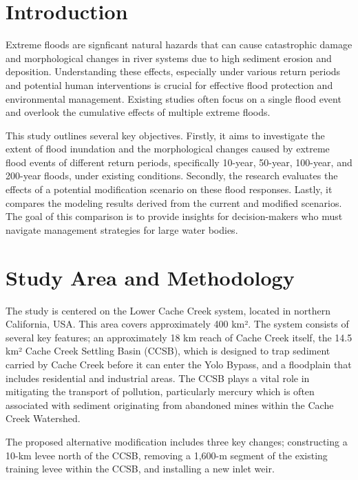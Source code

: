 \documentclass[a4paper, 11pt]{article}
\begin{document}
\section{Introduction}

\hspace*{0.5cm}Extreme floods are signficant natural hazards that can cause catastrophic damage and morphological changes in river systems due to high sediment erosion and deposition. Understanding these effects, especially under various return periods and potential human interventions is crucial for effective flood protection and environmental management. Existing studies often focus on a single flood event and overlook the cumulative effects of multiple extreme floods. 

This study outlines several key objectives. Firstly, it aims to investigate the extent of flood inundation and the morphological changes caused by extreme flood events of different return periods, specifically 10-year, 50-year, 100-year, and 200-year floods, under existing conditions. Secondly, the research evaluates the effects of a potential modification scenario on these flood responses. Lastly, it compares the modeling results derived from the current and modified scenarios. The goal of this comparison is to provide insights for decision-makers who must navigate management strategies for large water bodies.

\section{Study Area and Methodology}
\hspace*{0.5cm}The study is centered on the Lower Cache Creek system, located in northern California, USA. This area covers approximately 400 km². The system consists of several key features; an approximately 18 km reach of Cache Creek itself, the 14.5 km² Cache Creek Settling Basin (CCSB), which is designed to trap sediment carried by Cache Creek before it can enter the Yolo Bypass, and a floodplain that includes residential and industrial areas. The CCSB plays a vital role in mitigating the transport of pollution, particularly mercury which is often associated with sediment originating from abandoned mines within the Cache Creek Watershed.

The proposed alternative modification includes three key changes; constructing a 10-km levee north of the CCSB, removing a 1,600-m segment of the existing training levee within the CCSB, and installing a new inlet weir.
\end{document}
